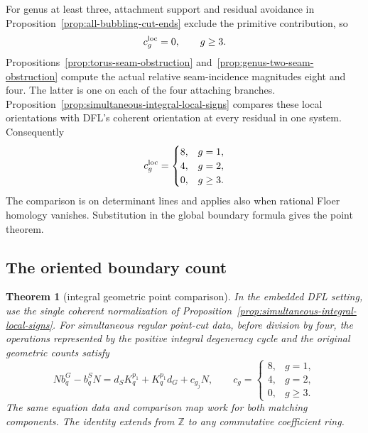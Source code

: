 \documentclass[11pt]{amsart}
\newtheorem{theorem}{Theorem}[section]
\theoremstyle{definition}
\theoremstyle{remark}
\theoremstyle{plain}
\begin{document}
For genus at least three, attachment support and residual
avoidance in Proposition~\ref{prop:all-bubbling-cut-ends}
exclude the primitive contribution, so
\begin{equation}\label{eq:higher-coefficient}
                           c_g^{\rm loc}=0,\qquad g\geq3.
\end{equation}
Propositions~\ref{prop:torus-seam-obstruction}
and~\ref{prop:genus-two-seam-obstruction}
compute the actual relative seam-incidence magnitudes
eight and four. The latter is one on each of the four
attaching branches.
Proposition~\ref{prop:simultaneous-integral-local-signs}
compares these local orientations with DFL's coherent
orientation at every residual in one system. Consequently
\begin{equation}\label{eq:integral-coefficients}
 c_g^{\rm loc}=
 \begin{cases}
 8,&g=1,\\
 4,&g=2,\\
 0,&g\geq3.
 \end{cases}
\end{equation}
The comparison is on determinant lines and applies
also when rational Floer homology vanishes. Substitution
in the global boundary formula gives the point theorem.

\subsection{The oriented boundary count}\label{sec:oriented-boundary}

\begin{theorem}[integral geometric point comparison]\label{thm:integral}
In the embedded DFL setting, use the single coherent normalization
of Proposition~\ref{prop:simultaneous-integral-local-signs}.
For simultaneous regular point-cut data, before division by four,
the operations represented by the positive integral degeneracy
cycle and the original geometric counts satisfy
\begin{equation}\label{eq:integral-main}
 N b_q^G-b_q^S N
 =d_SK_q^{p_1}+K_q^{p_1}d_G+c_{g_j}N,
 \qquad
 c_g=
 \begin{cases}
 8,&g=1,\\
 4,&g=2,\\
 0,&g\geq3.
 \end{cases}
\end{equation}
The same equation data and comparison map work for both
matching components. The identity extends from $\mathbb Z$
to any commutative coefficient ring.
\end{theorem}
\end{document}
